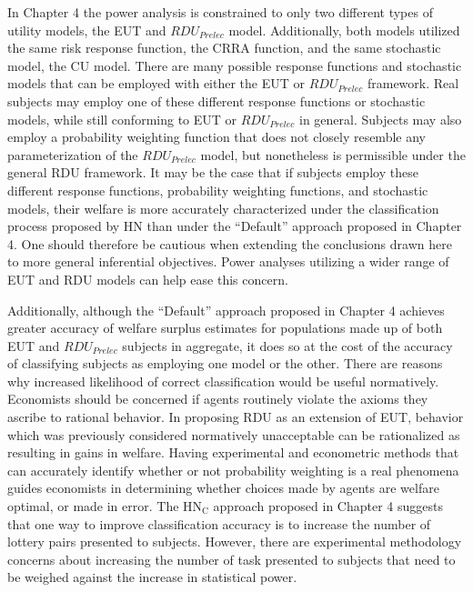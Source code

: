 \documentclass[../main.tex]{subfiles}
\begin{document}
In Chapter 4 the power analysis is constrained to only two different types of utility models, the EUT and $\mathit{RDU_{Prelec}}$ model.
Additionally, both models utilized the same risk response function, the CRRA function, and the same stochastic model, the CU model.
There are many possible response functions and stochastic models that can be employed with either the EUT or $\mathit{RDU_{Prelec}}$ framework.
Real subjects may employ one of these different response functions or stochastic models, while still conforming to EUT or $\mathit{RDU_{Prelec}}$ in general.
Subjects may also employ a probability weighting function that does not closely resemble any parameterization of the $\mathit{RDU_{Prelec}}$ model, but nonetheless is permissible under the general RDU framework.
It may be the case that if subjects employ these different response functions, probability weighting functions, and stochastic models, their welfare is more accurately characterized under the classification process proposed by HN than under the \enquote{Default} approach proposed in Chapter 4.
One should therefore be cautious when extending the conclusions drawn here to more general inferential objectives.
Power analyses utilizing a wider range of EUT and RDU models can help ease this concern.

Additionally, although the \enquote{Default} approach proposed in Chapter 4 achieves greater accuracy of welfare surplus estimates for populations made up of both EUT and $\mathit{RDU_{Prelec}}$ subjects in aggregate, it does so at the cost of the accuracy of classifying subjects as employing one model or the other.
There are reasons why increased likelihood of correct classification would be useful normatively.
Economists should be concerned if agents routinely violate the axioms they ascribe to rational behavior.
In proposing RDU as an extension of EUT, behavior which was previously considered normatively unacceptable can be rationalized as resulting in gains in welfare.
Having experimental and econometric methods that can accurately identify whether or not probability weighting is a real phenomena guides economists in determining whether choices made by agents are welfare optimal, or made in error.
The $\text{HN}_\text{C}$ approach proposed in Chapter 4 suggests that one way to improve classification accuracy is to increase the number of lottery pairs presented to subjects.
However, there are experimental methodology concerns about increasing the number of task presented to subjects that need to be weighed against the increase in statistical power.
\end{document}
